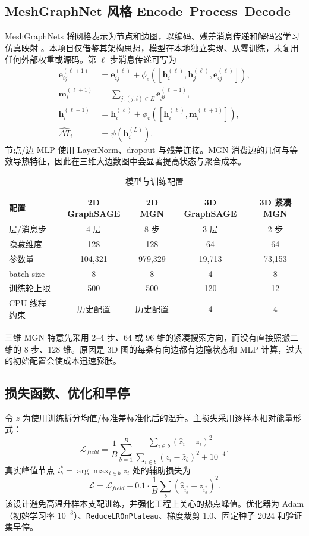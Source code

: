 \documentclass[11pt,a4paper]{article}
\newcommand{\dT}{\Delta T}
\newcommand{\code}[1]{\texttt{#1}}
\begin{document}
\subsection{MeshGraphNet 风格 Encode--Process--Decode}
MeshGraphNets 将网格表示为节点和边图，以编码、残差消息传递和解码器学习仿真映射 \cite{mgn}。本项目仅借鉴其架构思想，模型在本地独立实现、从零训练，未复用任何外部权重或源码。第 $\ell$ 步消息传递可写为
\begin{align}
\mathbf{e}_{ij}^{(\ell+1)}&=\mathbf{e}_{ij}^{(\ell)}+\phi_e([\mathbf{h}_i^{(\ell)},\mathbf{h}_j^{(\ell)},\mathbf{e}_{ij}^{(\ell)}]),\\
\mathbf{m}_i^{(\ell+1)}&=\sum_{j:(j,i)\in E}\mathbf{e}_{ji}^{(\ell+1)},\\
\mathbf{h}_i^{(\ell+1)}&=\mathbf{h}_i^{(\ell)}+\phi_v([\mathbf{h}_i^{(\ell)},\mathbf{m}_i^{(\ell+1)}]),\\
\widehat{\dT}_i&=\psi(\mathbf{h}_i^{(L)}).
\end{align}
节点/边 MLP 使用 LayerNorm、dropout 与残差连接。MGN 消费边的几何与等效导热特征，因此在三维大边数图中会显著提高状态与聚合成本。

\begin{table}[H]
\centering
\caption{模型与训练配置}
\label{tab:model-config}
\begin{tabular}{lcccc}
\toprule
配置 & 2D GraphSAGE & 2D MGN & 3D GraphSAGE & 3D 紧凑 MGN \\
\midrule
层/消息步 & 4 层 & 8 步 & 3 层 & 2 步 \\
隐藏维度 & 128 & 128 & 64 & 64 \\
参数量 & 104,321 & 979,329 & 19,713 & 73,153 \\
batch size & 8 & 8 & 4 & 8 \\
训练轮上限 & 500 & 500 & 120 & 12 \\
CPU 线程约束 & 历史配置 & 历史配置 & 4 & 4 \\
\bottomrule
\end{tabular}
\end{table}

三维 MGN 特意先采用 2--4 步、64 或 96 维的紧凑搜索方向，而没有直接照搬二维的 8 步、128 维。原因是 3D 图的每条有向边都有边隐状态和 MLP 计算，过大的初始配置会使成本迅速膨胀。

\subsection{损失函数、优化和早停}
令 $z$ 为使用训练拆分均值/标准差标准化后的温升。主损失采用逐样本相对能量形式：
\begin{equation}
\mathcal{L}_{field}=\frac{1}{B}\sum_{b=1}^{B}
\frac{\sum_{i\in b}(\hat{z}_i-z_i)^2}
{\sum_{i\in b}(z_i-\bar{z}_b)^2+10^{-4}}.
\label{eq:field-loss}
\end{equation}
真实峰值节点 $i_b^*=\arg\max_{i\in b}z_i$ 处的辅助损失为
\begin{equation}
\mathcal{L}=\mathcal{L}_{field}+0.1\cdot\frac{1}{B}\sum_b(\hat{z}_{i_b^*}-z_{i_b^*})^2.
\label{eq:loss}
\end{equation}
该设计避免高温升样本支配训练，并强化工程上关心的热点峰值。优化器为 Adam（初始学习率 $10^{-3}$）、\code{ReduceLROnPlateau}、梯度裁剪 1.0、固定种子 2024 和验证集早停。
\end{document}
